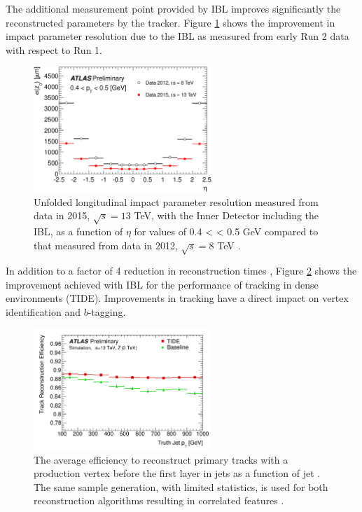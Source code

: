 The additional measurement point provided by IBL improves significantly the reconstructed parameters by the tracker. Figure \ref{fig:chap2:ATLAS:ITK:IBL:Imp} shows the improvement in impact parameter resolution due to the IBL as measured from early Run 2 data with respect to Run 1. 
\begin{figure}[htbp]
    \centering
    \includegraphics[width=0.6\textwidth]{Ch2/Img/IBL_impact.png}
    \caption{Unfolded longitudinal impact parameter resolution measured from data in 2015, $\sqrt{s}= 13$ TeV, with the Inner Detector including the IBL, as a function of $\eta$  for values of 0.4 < \pT < 0.5 GeV compared to that measured from data in 2012, $\sqrt{s} = 8$ TeV \cite{IBL_IP}.}
    \label{fig:chap2:ATLAS:ITK:IBL:Imp}
\end{figure}
In addition to a factor of 4 reduction in reconstruction times \cite{IBL_Time}, Figure \ref{fig:chap2:ATLAS:ITK:IBL:Trk} shows the improvement achieved with IBL for the performance of tracking in dense environments (TIDE). Improvements in tracking have a direct impact on vertex identification and $b$-tagging. 
\begin{figure}[htbp]
    \centering
    \includegraphics[width=0.6\textwidth]{Ch2/Img/IBL_track.png}
    \caption{The average efficiency to reconstruct primary tracks with a production vertex before the first layer in jets as a function of jet \pT. The same sample generation, with limited statistics, is used for both reconstruction algorithms resulting in correlated features \cite{IBL_Trk}.}
    \label{fig:chap2:ATLAS:ITK:IBL:Trk}
\end{figure}
